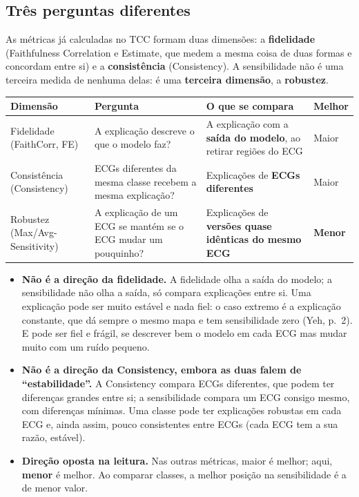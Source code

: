 \documentclass[11pt,a4paper]{article}
\begin{document}
\subsection{Três perguntas diferentes}
As métricas já calculadas no TCC formam duas dimensões: a \textbf{fidelidade} (Faithfulness Correlation e Estimate, que medem a mesma coisa de duas formas e concordam entre si) e a \textbf{consistência} (Consistency). A sensibilidade não é uma terceira medida de nenhuma delas: é uma \textbf{terceira dimensão}, a \textbf{robustez}.
\begin{center}\small
\begin{tabularx}{\linewidth}{lXXl}
\toprule
\textbf{Dimensão} & \textbf{Pergunta} & \textbf{O que se compara} & \textbf{Melhor} \\
\midrule
Fidelidade (FaithCorr, FE) & A explicação descreve o que o modelo faz? & A explicação com a \textbf{saída do modelo}, ao retirar regiões do ECG & Maior \\
\addlinespace
Consistência (Consistency) & ECGs diferentes da mesma classe recebem a mesma explicação? & Explicações de \textbf{ECGs diferentes} & Maior \\
\addlinespace
Robustez (Max/Avg-Sensitivity) & A explicação de um ECG se mantém se o ECG mudar um pouquinho? & Explicações de \textbf{versões quase idênticas do mesmo ECG} & \textbf{Menor} \\
\bottomrule
\end{tabularx}
\end{center}
\begin{itemize}
\item \textbf{Não é a direção da fidelidade.} A fidelidade olha a saída do modelo; a sensibilidade não olha a saída, só compara explicações entre si. Uma explicação pode ser muito estável e nada fiel: o caso extremo é a explicação constante, que dá sempre o mesmo mapa e tem sensibilidade zero (Yeh, p.~2). E pode ser fiel e frágil, se descrever bem o modelo em cada ECG mas mudar muito com um ruído pequeno.
\item \textbf{Não é a direção da Consistency, embora as duas falem de “estabilidade”.} A Consistency compara ECGs diferentes, que podem ter diferenças grandes entre si; a sensibilidade compara um ECG consigo mesmo, com diferenças mínimas. Uma classe pode ter explicações robustas em cada ECG e, ainda assim, pouco consistentes entre ECGs (cada ECG tem a sua razão, estável).
\item \textbf{Direção oposta na leitura.} Nas outras métricas, maior é melhor; aqui, \textbf{menor} é melhor. Ao comparar classes, a melhor posição na sensibilidade é a de menor valor.
\end{itemize}
\end{document}
